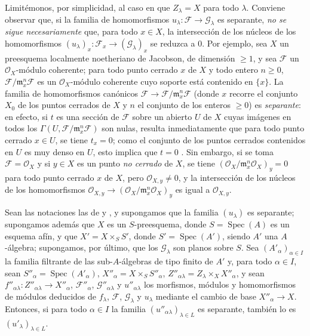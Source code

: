 \begin{remark}[11.9.11]
\label{IV.11.9.11}
Limitémonos, por simplicidad, al caso en que $Z_\lambda=X$ para todo $\lambda$.
Conviene observar que, si la familia de homomorfismos $u_\lambda:\mathcal F\to\mathcal G_\lambda$ es separante, \emph{no se sigue necesariamente} que, para todo $x\in X$, la intersección de los núcleos de los homomorfismos $(u_\lambda)_x:\mathcal F_x\to(\mathcal G_\lambda)_x$ se reduzca a 0.
Por ejemplo, sea $X$ un preesquema localmente noetheriano de Jacobson, de dimensión $\geq1$, y sea $\mathcal F$ un $\mathcal O_X$-módulo coherente; para todo punto cerrado $x$ de $X$ y todo entero $n\geq0$, $\mathcal F/\mathfrak m_x^n\mathcal F$ es un $\mathcal O_X$-módulo coherente cuyo soporte está contenido en $\{x\}$.
La familia de homomorfismos canónicos $\mathcal F\to\mathcal F/\mathfrak m_x^n\mathcal F$ (donde $x$ recorre el conjunto $X_0$ de los puntos cerrados de $X$ y $n$ el conjunto de los enteros $\geq0$) es \emph{separante}: en efecto, si $t$ es una sección de $\mathcal F$ sobre un abierto $U$ de $X$ cuyas imágenes en todos los $\Gamma(U,\mathcal F/\mathfrak m_x^n\mathcal F)$ son nulas, resulta inmediatamente que para todo punto cerrado $x\in U$, se tiene $t_x=0$; como el conjunto de los puntos cerrados contenidos en $U$ es muy denso en $U$, esto implica que $t=0$ .
Sin embargo, si se toma $\mathcal F=\mathcal O_X$ y si $y\in X$ es un punto \emph{no cerrado} de $X$, se tiene $(\mathcal O_X/\mathfrak m_x^n\mathcal O_X)_y=0$ para todo punto cerrado $x$ de $X$, pero $\mathcal O_{X,y}\neq0$, y la intersección de los núcleos de los homomorfismos $\mathcal O_{X,y}\to(\mathcal O_X/\mathfrak m_x^n\mathcal O_X)_y$ es igual a $\mathcal O_{X,y}$.
\end{remark}

\begin{lemma}[11.9.12]
\label{IV.11.9.12}
Sean las notaciones las de  y , y supongamos que la familia $(u_\lambda)$ es separante; supongamos además que $X$ es un $S$-preesquema, donde $S=\operatorname{Spec}(A)$ es un esquema afín, y que $X'=X\times_S S'$, donde $S'=\operatorname{Spec}(A')$, siendo $A'$ una $A$-álgebra; supongamos, por último, que los $\mathcal G_\lambda$ son \textup{planos} sobre $S$.
Sea $(A'_\alpha)_{\alpha\in I}$ la familia filtrante de las sub-$A$-álgebras de tipo finito de $A'$ y, para todo $\alpha\in I$, sean $S''_\alpha=\operatorname{Spec}(A'_\alpha)$, $X''_\alpha=X\times_S S''_\alpha$, $Z''_{\alpha\lambda}=Z_\lambda\times_X X''_\alpha$, y sean $f''_{\alpha\lambda}:Z''_{\alpha\lambda}\to X''_\alpha$, $\mathcal F''_\alpha$, $\mathcal G''_{\alpha\lambda}$ y $u''_{\alpha\lambda}$ los morfismos, módulos y homomorfismos de módulos deducidos de $f_\lambda$, $\mathcal F$, $\mathcal G_\lambda$ y $u_\lambda$ mediante el cambio de base $X''_\alpha\to X$.
Entonces, si para todo $\alpha\in I$ la familia $(u''_{\alpha\lambda})_{\lambda\in L}$ es separante, también lo es $(u'_\lambda)_{\lambda\in L}$.
\end{lemma}

